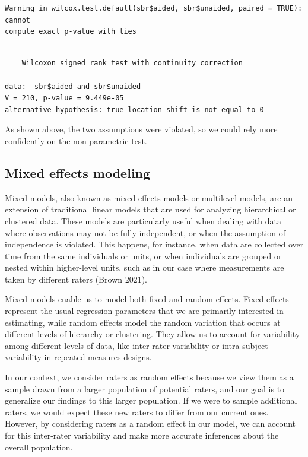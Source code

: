 \documentclass[
  letterpaper,
]{book}
\begin{document}
\begin{verbatim}
Warning in wilcox.test.default(sbr$aided, sbr$unaided, paired = TRUE): cannot
compute exact p-value with ties
\end{verbatim}

\begin{verbatim}

    Wilcoxon signed rank test with continuity correction

data:  sbr$aided and sbr$unaided
V = 210, p-value = 9.449e-05
alternative hypothesis: true location shift is not equal to 0
\end{verbatim}

As shown above, the two assumptions were violated, so we could rely more
confidently on the non-parametric test.

\hypertarget{mixed-effects-modeling}{%
\subsection{Mixed effects modeling}\label{mixed-effects-modeling}}

Mixed models, also known as mixed effects models or multilevel models,
are an extension of traditional linear models that are used for
analyzing hierarchical or clustered data. These models are particularly
useful when dealing with data where observations may not be fully
independent, or when the assumption of independence is violated. This
happens, for instance, when data are collected over time from the same
individuals or units, or when individuals are grouped or nested within
higher-level units, such as in our case where measurements are taken by
different raters (Brown 2021).

Mixed models enable us to model both fixed and random effects. Fixed
effects represent the usual regression parameters that we are primarily
interested in estimating, while random effects model the random
variation that occurs at different levels of hierarchy or clustering.
They allow us to account for variability among different levels of data,
like inter-rater variability or intra-subject variability in repeated
measures designs.

In our context, we consider raters as random effects because we view
them as a sample drawn from a larger population of potential raters, and
our goal is to generalize our findings to this larger population. If we
were to sample additional raters, we would expect these new raters to
differ from our current ones. However, by considering raters as a random
effect in our model, we can account for this inter-rater variability and
make more accurate inferences about the overall population.
\end{document}
